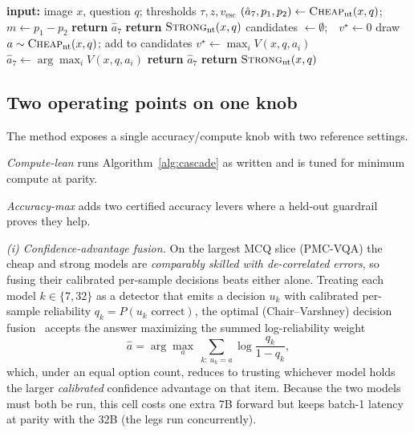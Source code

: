 \documentclass[conference]{IEEEtran}
\begin{document}
\begin{algorithm}[t]
\caption{Format-aware adaptive cascade (one query)}
\label{alg:cascade}
\begin{algorithmic}[1]
\STATE \textbf{input:} image $x$, question $q$; thresholds $\tau, z, v_{\text{esc}}$
  \STATE $(\hat a_7, p_1, p_2) \gets \textsc{Cheap}_{\text{nt}}(x,q)$;\ \ $m \gets p_1-p_2$
     \STATE \textbf{return} $\hat a_7$ 
  \ELSE
     \STATE \textbf{return} $\textsc{Strong}_{\text{nt}}(x,q)$ 
  \ENDIF
\ELSE
  \STATE candidates $\gets \emptyset$;\ \ $v^\star \gets 0$
     \STATE draw $a \sim \textsc{Cheap}_{\text{nt}}(x,q)$; add to candidates
     \STATE $v^\star \gets \max_i V(x,q,a_i)$
  \ENDWHILE
  \STATE $\hat a_7 \gets \arg\max_i V(x,q,a_i)$
     \STATE \textbf{return} $\hat a_7$
  \ELSE
     \STATE \textbf{return} $\textsc{Strong}_{\text{nt}}(x,q)$
  \ENDIF
\ENDIF
\end{algorithmic}
\end{algorithm}

\subsection{Two operating points on one knob}
The method exposes a single accuracy/compute knob with two reference settings.

\emph{Compute-lean} runs Algorithm~\ref{alg:cascade} as written and is tuned for minimum compute at parity.

\emph{Accuracy-max} adds two certified accuracy levers where a held-out guardrail proves they help.

\emph{(i) Confidence-advantage fusion.} On the largest MCQ slice (PMC-VQA) the cheap and strong models are \emph{comparably skilled with de-correlated errors}, so fusing their calibrated per-sample decisions beats either alone. Treating each model $k\in\{7,32\}$ as a detector that emits a decision $u_k$ with calibrated per-sample reliability $q_k=P(u_k\text{ correct})$, the optimal (Chair--Varshney) decision fusion~\cite{chairvarshney} accepts the answer maximizing the summed log-reliability weight
\begin{equation}
\hat a = \arg\max_{a}\ \sum_{k:\,u_k=a} \log\frac{q_k}{1-q_k}, \label{eq:fuse}
\end{equation}
which, under an equal option count, reduces to trusting whichever model holds the larger \emph{calibrated} confidence advantage on that item. Because the two models must both be run, this cell costs one extra 7B forward but keeps batch-1 latency at parity with the 32B (the legs run concurrently).
\end{document}
